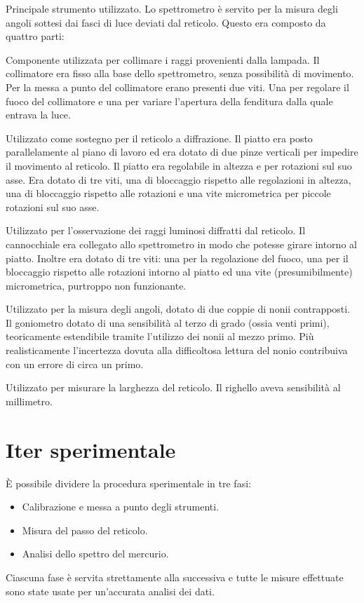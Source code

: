 \documentclass[a4paper,10pt]{article}
\begin{document}
\begin{description}[align=left]
		\item [Uno spettrometro] Principale strumento utilizzato. Lo spettrometro è servito per la misura degli angoli sottesi dai fasci di luce deviati dal reticolo. Questo era composto da quattro parti:
		\begin{description} [align=left]
			\item [Un collimatore] Componente utilizzata per collimare i raggi provenienti dalla lampada. Il collimatore era fisso alla base dello spettrometro, senza possibilità di movimento. Per la messa a punto del collimatore erano presenti due viti. Una per regolare il fuoco del collimatore e una per variare l'apertura della fenditura dalla quale entrava la luce.
			\item [Un piatto] Utilizzato come sostegno per il reticolo a diffrazione. Il piatto era posto parallelamente al piano di lavoro ed era dotato di due pinze verticali per impedire il movimento al reticolo. Il piatto era regolabile in altezza e per rotazioni sul suo asse. Era dotato di tre viti, una di bloccaggio rispetto alle regolazioni in altezza, una di bloccaggio rispetto alle rotazioni e una vite micrometrica per piccole rotazioni sul suo asse.
			\item[Un cannocchiale] Utilizzato per l'osservazione dei raggi luminosi diffratti dal reticolo. Il cannocchiale era collegato allo spettrometro in modo che potesse girare intorno al piatto. Inoltre era dotato di tre viti: una per la regolazione del fuoco, una per il bloccaggio rispetto alle rotazioni intorno al piatto ed una vite (presumibilmente) micrometrica, purtroppo non funzionante.
			\item[Un goniometro] Utilizzato per la misura degli angoli, dotato di due coppie di nonii contrapposti. Il goniometro dotato di una sensibilità al terzo di grado (ossia venti primi), teoricamente estendibile tramite l'utilizzo dei nonii al mezzo primo. Più realisticamente l'incertezza dovuta alla difficoltosa lettura del nonio contribuiva con un errore di circa un primo.
		
		\item[Un righello] Utilizzato per misurare la larghezza del reticolo. Il righello aveva sensibilità al millimetro.
		\end{description}
	\end{description}
	\section{Iter sperimentale}
	È possibile dividere la procedura sperimentale in tre fasi:
	\begin{itemize}
		\item Calibrazione e messa a punto degli strumenti.
		\item Misura del passo del reticolo.
		\item Analisi dello spettro del mercurio.
	\end{itemize}
	Ciascuna fase è servita strettamente alla successiva e tutte le misure effettuate sono state usate per un'accurata analisi dei dati.
\end{document}
